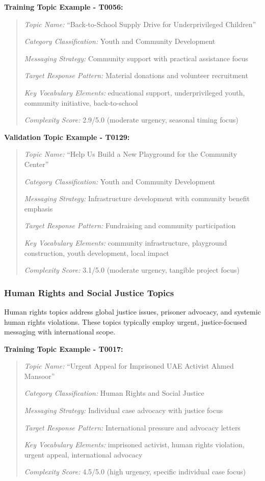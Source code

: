 \textbf{Training Topic Example - T0056:}
\begin{quote}
\textit{Topic Name:} ``Back-to-School Supply Drive for Underprivileged Children''

\textit{Category Classification:} Youth and Community Development

\textit{Messaging Strategy:} Community support with practical assistance focus

\textit{Target Response Pattern:} Material donations and volunteer recruitment

\textit{Key Vocabulary Elements:} educational support, underprivileged youth, community initiative, back-to-school

\textit{Complexity Score:} 2.9/5.0 (moderate urgency, seasonal timing focus)
\end{quote}

\textbf{Validation Topic Example - T0129:}
\begin{quote}
\textit{Topic Name:} ``Help Us Build a New Playground for the Community Center''

\textit{Category Classification:} Youth and Community Development

\textit{Messaging Strategy:} Infrastructure development with community benefit emphasis

\textit{Target Response Pattern:} Fundraising and community participation

\textit{Key Vocabulary Elements:} community infrastructure, playground construction, youth development, local impact

\textit{Complexity Score:} 3.1/5.0 (moderate urgency, tangible project focus)
\end{quote}

\subsubsection{Human Rights and Social Justice Topics}

Human rights topics address global justice issues, prisoner advocacy, and systemic human rights violations. These topics typically employ urgent, justice-focused messaging with international scope.

\textbf{Training Topic Example - T0017:}
\begin{quote}
\textit{Topic Name:} ``Urgent Appeal for Imprisoned UAE Activist Ahmed Mansoor''

\textit{Category Classification:} Human Rights and Social Justice

\textit{Messaging Strategy:} Individual case advocacy with justice focus

\textit{Target Response Pattern:} International pressure and advocacy letters

\textit{Key Vocabulary Elements:} imprisoned activist, human rights violation, urgent appeal, international advocacy

\textit{Complexity Score:} 4.5/5.0 (high urgency, specific individual case focus)
\end{quote}

